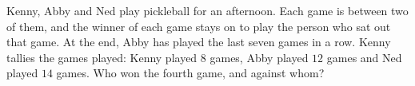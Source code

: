 Kenny, Abby and Ned play pickleball for an afternoon. Each game is between two of them, and the winner of each game stays on to play the person who sat out that game. At the end, Abby has played the last seven games in a row. Kenny tallies the games played: Kenny played $8$ games, Abby played $12$ games and Ned played $14$ games. Who won the fourth game, and against whom?
